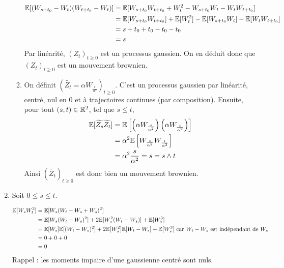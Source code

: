 \begin{enumerate}
\begin{enumerate}
      \newcommand{\wst}{W_{s+t_0}}
      \begin{equation*}
      \begin{split}
        \E[(\wst - \wt)(\wtt - \wt)] &= \E[\wst \wtt + \wt^2 - \wst\wt - \wt\wtt] \\
        &= \E[\wst\wtt] + \E[\wt^2] - \E[\wst\wt] - \E[\wt\wtt] \\
        &= s + t_0 + t_0 - t_0 -t_0 \\
        &= s
      \end{split}
      \end{equation*}
      Par linéarité, $(Z_t)_{t \geq 0}$ est un processus gaussien. On en déduit donc que $(Z_t)_{t\geq 0}$ est un mouvement brownien.
    \item On définit $\left(\widetilde{Z_t} = \alpha W_{ \frac{t}{\alpha^2}}\right)_{t \geq 0}$. C'est un processus gaussien par linéarité, centré, nul en 0 et à trajectoires continues (par composition).
      \renewcommand{\ws}{W_{\frac{s}{\alpha^2}}}
      \renewcommand{\wt}{W_{\frac{t}{\alpha^2}}}
      Ensuite, pour tout $(s,t) \in \mathbb{R}^2$, tel que $s \leq t$, 
      \begin{equation*}
      \begin{split}
        \E[\widetilde{Z_s}\widetilde{Z_t}] &= \E\left[\left(\alpha\ws\right)\left(\alpha\wt\right)\right] \\
        &= \alpha^2 \E\left[\ws\wt\right] \\
        &= \alpha^2 \frac{s}{\alpha^2} = s = s\wedge t
      \end{split}
      \end{equation*}
      Ainsi $(\widetilde{Z_t})_{t \geq 0}$ est donc bien un mouvement brownien.
  \end{enumerate}
    \item Soit $0 \leq s \leq t$.
      \renewcommand{\wt}{W_t}
      \renewcommand{\ws}{W_s}

      \begin{equation*}
      \begin{split}
        \E[\ws\wt^2] &= \E[\ws(\wt - \ws + \ws)^2] \\
        &= \E[\ws(\wt-\ws)^2] + 2\E[\ws^2(\wt - \ws)] + \E[\ws^3] \\
        &= \E[\ws]\E[(\wt-\ws)^2] + 2\E[\ws^2] \E[\wt-\ws] + \E[\ws^3] \text{ car } \wt-\ws \text{ est indépendant de } \ws \\
        &= 0 + 0 + 0\\
        &= 0
      \end{split}
      \end{equation*}
      Rappel : les moments impaire d'une gaussienne centré sont nuls. \\


\end{enumerate}
